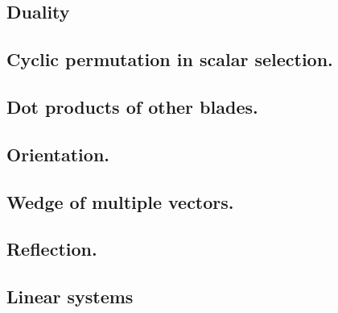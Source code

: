 \subsection{Duality}
\subsection{Cyclic permutation in scalar selection.}
\subsection{Dot products of other blades.}
\subsection{Orientation.}
\subsection{Wedge of multiple vectors.}
\subsection{Reflection.}
\subsection{Linear systems}

